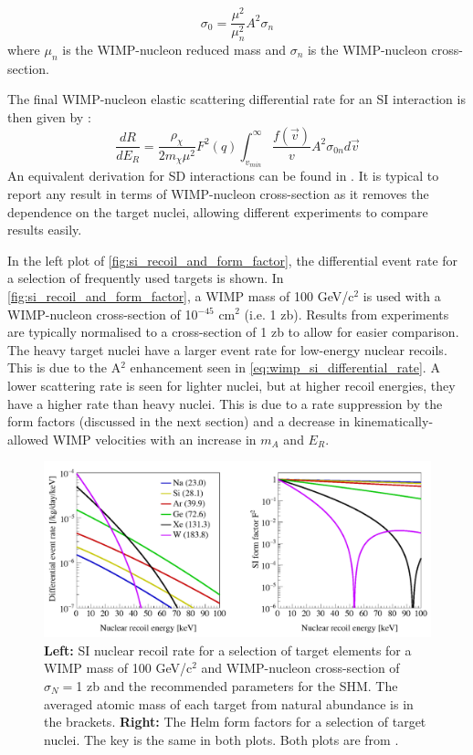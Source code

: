 \begin{equation}
    \sigma_{0} = \frac{\mu^2}{\mu^2_n}A^2 \sigma_{n}
\end{equation}
where $\mu_n$ is the WIMP-nucleon reduced mass and $\sigma_n$ is the WIMP-nucleon cross-section.
\par
The final WIMP-nucleon elastic scattering differential rate for an SI interaction is then given by \cite{wimp_theory_ref}:
\begin{equation}
    \frac{dR}{dE_R} = \frac{\rho_\chi}{2 m_\chi \mu^2} F^2(q) \int^{\infty}_{v_{min}} \frac{f(\vec{v})}{v} A^2 \sigma_{0n} d\vec{v}
    \label{eq:wimp_si_differential_rate}
\end{equation}
An equivalent derivation for SD interactions can be found in \cite{wimp_theory_ref}.
It is typical to report any result in terms of WIMP-nucleon cross-section as it removes the dependence on the target nuclei, allowing different experiments to compare results easily.

\par
In the left plot of \autoref{fig:si_recoil_and_form_factor}, the differential event rate for a selection of frequently used targets is shown.
In \autoref{fig:si_recoil_and_form_factor}, a WIMP mass of 100 GeV/c$^2$ is used with a WIMP-nucleon cross-section of 10$^{-45}$ cm$^2$ (i.e. 1 zb).
Results from experiments are typically normalised to a cross-section of 1 zb to allow for easier comparison.
The heavy target nuclei have a larger event rate for low-energy nuclear recoils.
This is due to the A$^2$ enhancement seen in \autoref{eq:wimp_si_differential_rate}.
A lower scattering rate is seen for lighter nuclei, but at higher recoil energies, they have a higher rate than heavy nuclei.
This is due to a rate suppression by the form factors (discussed in the next section) and a decrease in kinematically-allowed WIMP velocities with an increase in $m_A$ and $E_R$.

\begin{figure}
    \centering
    \includegraphics[width=\textwidth]{Figures/LZ/SI_recoil_rate_and_spectra.png}
    \caption{\textbf{Left:} SI nuclear recoil rate for a selection of target elements for a WIMP mass of 100 GeV/c$^2$ and WIMP-nucleon cross-section of $\sigma_N=$1 zb and the recommended parameters for the SHM. The averaged atomic mass of each target from natural abundance is in the brackets.
    \textbf{Right:} The Helm form factors for a selection of target nuclei. The key is the same in both plots.
    Both plots are from \cite{LZ_Ibles_LZStats_Thesis_ref}
    \label{fig:si_recoil_and_form_factor}.
           }
\end{figure}
 

